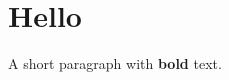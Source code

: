\documentclass{article}
\begin{document}
\section{Hello}
A short paragraph with \textbf{bold} text.
\end{document}
